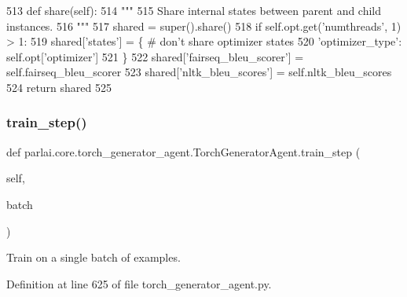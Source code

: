 \begin{DoxyCode}
513     \textcolor{keyword}{def }share(self):
514         \textcolor{stringliteral}{"""}
515 \textcolor{stringliteral}{        Share internal states between parent and child instances.}
516 \textcolor{stringliteral}{        """}
517         shared = super().share()
518         \textcolor{keywordflow}{if} self.opt.get(\textcolor{stringliteral}{'numthreads'}, 1) > 1:
519             shared[\textcolor{stringliteral}{'states'}] = \{  \textcolor{comment}{# don't share optimizer states}
520                 \textcolor{stringliteral}{'optimizer\_type'}: self.opt[\textcolor{stringliteral}{'optimizer'}]
521             \}
522         shared[\textcolor{stringliteral}{'fairseq\_bleu\_scorer'}] = self.fairseq\_bleu\_scorer
523         shared[\textcolor{stringliteral}{'nltk\_bleu\_scores'}] = self.nltk\_bleu\_scores
524         \textcolor{keywordflow}{return} shared
525 
\end{DoxyCode}
\mbox{\label{classparlai_1_1core_1_1torch__generator__agent_1_1TorchGeneratorAgent_afe2226ddfc838ec27580e3499cc0bae7}} 
\subsubsection{\texorpdfstring{train\+\_\+step()}{train\_step()}}
{\footnotesize\ttfamily def parlai.\+core.\+torch\+\_\+generator\+\_\+agent.\+Torch\+Generator\+Agent.\+train\+\_\+step (\begin{DoxyParamCaption}\item[{}]{self,  }\item[{}]{batch }\end{DoxyParamCaption})}

\begin{DoxyVerb}Train on a single batch of examples.
\end{DoxyVerb}
 

Definition at line 625 of file torch\+\_\+generator\+\_\+agent.\+py.



